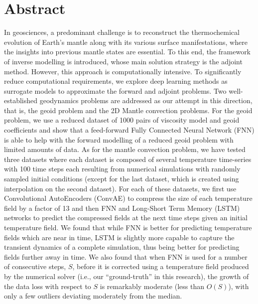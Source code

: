 \chapter*{Abstract}
In geosciences, a predominant challenge is to reconstruct the thermochemical evolution of Earth's mantle along with its various surface manifestations, where the insights into previous mantle states are essential. To this end, 
the framework of inverse modelling is introduced, whose main solution strategy is the adjoint method. However, this approach is computationally intensive. To significantly reduce computational requirements, we explore deep learning methods as surrogate models to approximate the forward and adjoint problems. Two well-established geodynamics problems are addressed as our attempt in this direction, that is, the geoid problem and the 2D Mantle convection problems. For the geoid problem, we use a reduced dataset of 1000 pairs of viscosity model and geoid coefficients and show that a feed-forward Fully Connected Neural Network (FNN) is able to help with the forward modelling of a reduced geoid problem with limited amounts of data. As for the mantle convection problem, we have tested three datasets where each dataset is composed of several temperature time-series with 100 time steps each resulting from numerical simulations with randomly sampled initial conditions (except for the last dataset, which is created using interpolation on the second dataset). For each of these datasets, we first use Convolutional AutoEncoders (ConvAE) to compress the size of each temperature field by a factor of 13 and then FNN and Long-Short Term Memory (LSTM) networks to predict the compressed fields at the next time steps given an initial temperature field. We found that while FNN is better for predicting temperature fields which are near in time, LSTM is slightly more capable to capture the transient dynamics of a complete simulation, thus being better for predicting fields further away in time. We also found that when FNN is used for a number of consecutive steps, $S$, before it is corrected using a temperature field produced by the numerical solver (i.e., our ``ground-truth'' in this research), the growth of the data loss with respect to $S$ is remarkably moderate (less than $O(S)$), with only a few outliers deviating moderately from the median.